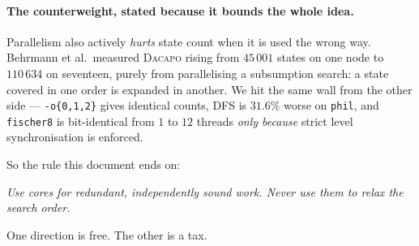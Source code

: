 \paragraph{The counterweight, stated because it bounds the whole idea.} Parallelism also actively
\emph{hurts} state count when it is used the wrong way. Behrmann et al.\ measured \textsc{Dacapo}
rising from $45\,001$ states on one node to $110\,634$ on seventeen, purely from parallelising a
subsumption search: a state covered in one order is expanded in another. We hit the same wall from
the other side --- \verifyta{} \texttt{-o\{0,1,2\}} gives identical counts, DFS is $31.6\%$ worse on
\texttt{phil}, and \texttt{fischer8} is bit-identical from $1$ to $12$ threads \emph{only because}
strict level synchronisation is enforced.

So the rule this document ends on:

\begin{center}
\emph{Use cores for redundant, independently sound work. Never use them to relax the search order.}
\end{center}

One direction is free. The other is a tax.
